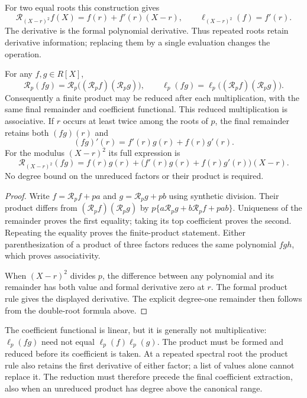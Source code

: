 For two equal roots this construction gives
\[
 \mathcal R_{(X-r)^2}f(X)=f(r)+f'(r)(X-r),
 \qquad \ell_{(X-r)^2}(f)=f'(r).
\]
The derivative is the formal polynomial derivative. Thus repeated
roots retain derivative information; replacing them by a single
evaluation changes the operation.

\begin{proposition}
\label{prop:canonical-remainder-products}
For any $f,g\in R[X]$,
\[
 \mathcal R_p(fg)=
 \mathcal R_p\bigl((\mathcal R_p f)(\mathcal R_p g)\bigr),
 \qquad
 \ell_p(fg)=\ell_p\bigl((\mathcal R_p f)(\mathcal R_p g)\bigr).
\]
Consequently a finite product may be reduced after each multiplication,
with the same final remainder and coefficient functional. This reduced
multiplication is associative. If $r$ occurs at least twice among the
roots of $p$, the final remainder retains both $(fg)(r)$ and
\[
 (fg)'(r)=f'(r)g(r)+f(r)g'(r).
\]
For the modulus $(X-r)^2$ its full expression is
\[
 \mathcal R_{(X-r)^2}(fg)
 =f(r)g(r)+\bigl(f'(r)g(r)+f(r)g'(r)\bigr)(X-r).
\]
No degree bound on the unreduced factors or their product is required.
\end{proposition}

\begin{proof}
Write $f=\mathcal R_p f+pa$ and $g=\mathcal R_p g+pb$ using
synthetic division. Their product differs from
$(\mathcal R_p f)(\mathcal R_p g)$ by
$p\{a\mathcal R_p g+b\mathcal R_p f+pab\}$. Uniqueness of the
remainder proves the first equality; taking its top coefficient proves
the second. Repeating the equality proves the finite-product statement.
Either parenthesization of a product of three factors reduces the same
polynomial $fgh$, which proves associativity.

When $(X-r)^2$ divides $p$, the difference between any polynomial and its
remainder has both value and formal derivative zero at $r$. The formal
product rule gives the displayed derivative. The explicit degree-one
remainder then follows from the double-root formula above.
\end{proof}

The coefficient functional is linear, but it is generally not
multiplicative: $\ell_p(fg)$ need not equal $\ell_p(f)\ell_p(g)$.
The product must be formed and reduced before its coefficient is taken.
At a repeated spectral root the product rule also retains the first
derivative of either factor; a list of values alone cannot replace it.
The reduction must therefore precede the final coefficient extraction,
also when an unreduced product has degree above the canonical range.

